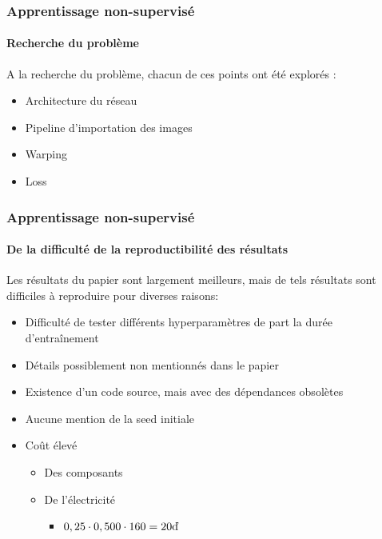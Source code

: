 \documentclass[aspectratio=169]{beamer}
\newcommand{\1}{\mathbf{1}}
\begin{document}
\begin{frame}
\frametitle{Apprentissage non-supervisé}
\framesubtitle{Recherche du problème}
A la recherche du problème, chacun de ces points ont été explorés :
\begin{itemize}
  \item Architecture du réseau
  \pause
  \item Pipeline d'importation des images
  \pause
  \item Warping
  \pause
  \item Loss
\end{itemize}

\end{frame}

\begin{frame}
\frametitle{Apprentissage non-supervisé}
\framesubtitle{De la difficulté de la reproductibilité des résultats}
Les résultats du papier sont largement meilleurs, mais de tels résultats sont difficiles à reproduire pour diverses raisons:
\begin{itemize}
  \item Difficulté de tester différents hyperparamètres de part la durée d'entraînement
  \pause
  \item Détails possiblement non mentionnés dans le papier
  \pause
  \item Existence d'un code source, mais avec des dépendances obsolètes
  \pause
  \item Aucune mention de la seed initiale
  \pause
  \item Coût élevé
  \begin{itemize}
    \item Des composants
    \pause
    \item De l'électricité
    \pause
    \begin{itemize}
      \item $0,25\cdot0,500\cdot160=20\EUR$
    \end{itemize}
  \end{itemize}
\end{itemize}


\end{frame}
\end{document}
